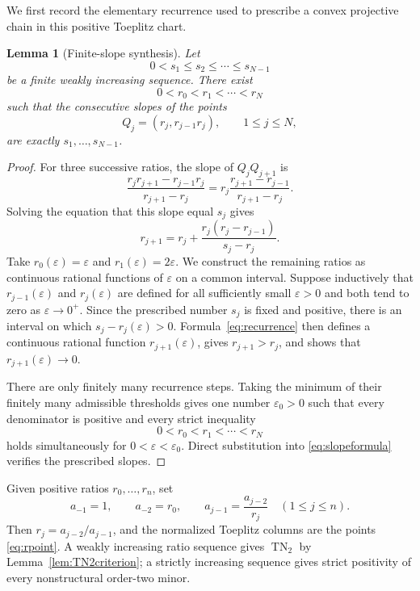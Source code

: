 \documentclass{amsart}
\numberwithin{equation}{section}
\newtheorem{lemma}[theorem]{Lemma}
\theoremstyle{definition}
\theoremstyle{remark}
\DeclareMathOperator{\TN}{TN}
\begin{document}
We first record the elementary recurrence used to prescribe a convex projective chain in this positive Toeplitz chart.

\begin{lemma}[Finite-slope synthesis]\label{lem:slope-synthesis}
Let
\[
 0<s_1\le s_2\le\cdots\le s_{N-1}
\]
be a finite weakly increasing sequence.  There exist
\[
 0<r_0<r_1<\cdots<r_N
\]
such that the consecutive slopes of the points
\begin{equation}\label{eq:synthpoints}
 Q_j=(r_j,r_{j-1}r_j),
 \qquad 1\le j\le N,
\end{equation}
are exactly $s_1,\ldots,s_{N-1}$.
\end{lemma}

\begin{proof}
For three successive ratios, the slope of $Q_jQ_{j+1}$ is
\begin{equation}\label{eq:slopeformula}
 \frac{r_jr_{j+1}-r_{j-1}r_j}{r_{j+1}-r_j}
 =r_j\frac{r_{j+1}-r_{j-1}}{r_{j+1}-r_j}.
\end{equation}
Solving the equation that this slope equal $s_j$ gives
\begin{equation}\label{eq:recurrence}
 r_{j+1}
 =r_j+\frac{r_j(r_j-r_{j-1})}{s_j-r_j}.
\end{equation}
Take $r_0(\varepsilon)=\varepsilon$ and $r_1(\varepsilon)=2\varepsilon$.  We construct the remaining ratios as continuous rational functions of $\varepsilon$ on a common interval.  Suppose inductively that $r_{j-1}(\varepsilon)$ and $r_j(\varepsilon)$ are defined for all sufficiently small $\varepsilon>0$ and both tend to zero as $\varepsilon\to0^+$.  Since the prescribed number $s_j$ is fixed and positive, there is an interval on which $s_j-r_j(\varepsilon)>0$.  Formula~\eqref{eq:recurrence} then defines a continuous rational function $r_{j+1}(\varepsilon)$, gives $r_{j+1}>r_j$, and shows that $r_{j+1}(\varepsilon)\to0$.

There are only finitely many recurrence steps.  Taking the minimum of their finitely many admissible thresholds gives one number $\varepsilon_0>0$ such that every denominator is positive and every strict inequality
\[
 0<r_0<r_1<\cdots<r_N
\]
holds simultaneously for $0<\varepsilon<\varepsilon_0$.  Direct substitution into \eqref{eq:slopeformula} verifies the prescribed slopes.
\end{proof}

Given positive ratios $r_0,\ldots,r_n$, set
\begin{equation}\label{eq:recovercoeff}
 a_{-1}=1,
 \qquad
 a_{-2}=r_0,
 \qquad
 a_{j-1}=\frac{a_{j-2}}{r_j}
 \quad(1\le j\le n).
\end{equation}
Then $r_j=a_{j-2}/a_{j-1}$, and the normalized Toeplitz columns are the points \eqref{eq:rpoint}.  A weakly increasing ratio sequence gives $\TN_2$ by Lemma~\ref{lem:TN2criterion}; a strictly increasing sequence gives strict positivity of every nonstructural order-two minor.
\end{document}
